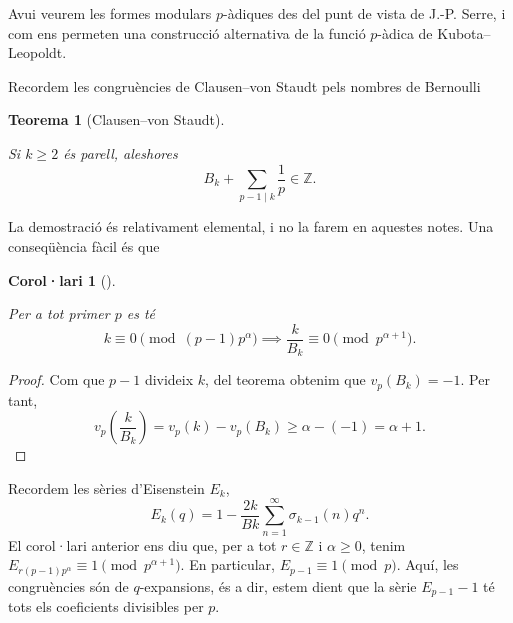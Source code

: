 \documentclass[
  letterpaper,
  DIV=11,
  numbers=noendperiod]{scrreprt}
\theoremstyle{plain}
\newtheorem{theorem}{Teorema}[chapter]
\theoremstyle{plain}
\newtheorem{corollary}{Corol·lari}[chapter]
\theoremstyle{definition}
\theoremstyle{plain}
\theoremstyle{plain}
\theoremstyle{definition}
\theoremstyle{remark}
\begin{document}
Avui veurem les formes modulars \(p\)-àdiques des del punt de vista de
J.-P. Serre, i com ens permeten una construcció alternativa de la funció
\(p\)-àdica de Kubota--Leopoldt.

Recordem les congruències de Clausen--von Staudt pels nombres de
Bernoulli

\begin{theorem}[Clausen--von
Staudt]\protect\hypertarget{thm-clausen-vonstaudt}{}\label{thm-clausen-vonstaudt}

Si \(k\geq 2\) és parell, aleshores \[
B_k + \sum_{p-1\mid k} \frac{1}{p} \in \mathbb{Z}.
\]

\end{theorem}

La demostració és relativament elemental, i no la farem en aquestes
notes. Una conseqüència fàcil és que

\begin{corollary}[]\protect\hypertarget{cor-}{}\label{cor-}

Per a tot primer \(p\) es té \[
k \equiv 0 \pmod{(p-1)p^\alpha} \implies \frac{k}{B_k}\equiv 0\pmod{p^{\alpha+1}}.
\]

\end{corollary}

\begin{proof}
Com que \(p-1\) divideix \(k\), del teorema obtenim que \(v_p(B_k)=-1\).
Per tant, \[
v_p(\frac{k}{B_k}) = v_p(k)-v_p(B_k)\geq \alpha - (-1)= \alpha + 1.
\]
\end{proof}

Recordem les sèries d'Eisenstein \(E_k\), \[
E_k(q) = 1 - \frac{2k}{Bk} \sum_{n=1}^\infty \sigma_{k-1}(n)q^n.
\] El corol·lari anterior ens diu que, per a tot \(r\in\mathbb{Z}\) i
\(\alpha\geq 0\), tenim
\(E_{r(p-1)p^\alpha} \equiv 1 \pmod{p^{\alpha+1}}\). En particular,
\(E_{p-1}\equiv 1\pmod p\). Aquí, les congruències són de
\(q\)-expansions, és a dir, estem dient que la sèrie \(E_{p-1}-1\) té
tots els coeficients divisibles per \(p\).
\end{document}
